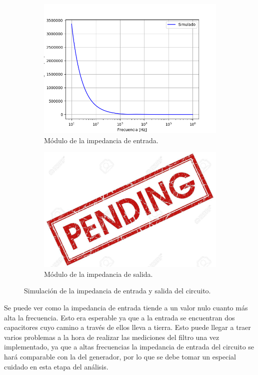 \begin{figure}[H]
	\centering
	\begin{subfigure}[t]{0.49\textwidth}
	\hspace*{-2cm}
	\centering
		\includegraphics[width=1.2\textwidth]{Imagenes/sim_zin.png}
		\caption{Módulo de la impedancia de entrada.}
	\end{subfigure}
	\begin{subfigure}[t]{0.49\textwidth}
	\centering
		\includegraphics[width=1.2\textwidth]{Imagenes/pend.jpg}
		\caption{Módulo de la impedancia de salida.}
	\end{subfigure}
	\label{fig:zin_zout}
	\caption{Simulación de la impedancia de entrada y salida del circuito.}
\end{figure}

Se puede ver como la impedancia de entrada tiende a un valor nulo cuanto más alta la frecuencia. Esto era esperable ya que a la entrada se encuentran dos capacitores cuyo camino a través de ellos lleva a tierra. Esto puede llegar a traer varios problemas a la hora de realizar las mediciones del filtro una vez implementado, ya que a altas frecuencias la impedancia de entrada del circuito se hará comparable con la del generador, por lo que se debe tomar un especial cuidado en esta etapa del análisis.

